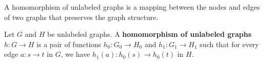 A homomorphism of unlabeled graphs is a mapping between the nodes and edges of two graphs that preserves the graph structure.
\begin{definition}
    \label{def:unlabeled_graph:homomorphism}
    Let \( G \) and \( H \) be unlabeled graphs. A \textbf{homomorphism of unlabeled graphs} \( h: G \to H \) is a pair of functions \( h_0: G_0 \to H_0 \) and \( h_1: G_1 \to H_1 \) such that for every edge \( a: s \to t \) in \( G \), we have \( h_1(a) : h_0(s) \to h_0(t) \) in \( H \).
\end{definition}
    